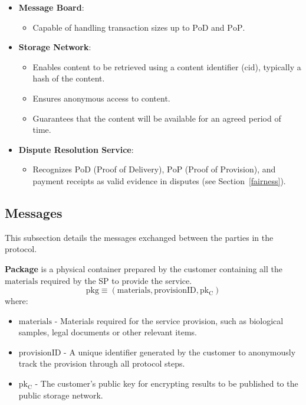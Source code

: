 \documentclass[pdftex,twocolumn,epjc3]{svjour3}
\begin{document}
\begin{itemize}
\item \textbf{Message Board}:
  \begin{itemize}
      \item Capable of handling transaction sizes up to $\mathrm{PoD}$ and $\mathrm{PoP}$.
  \end{itemize}

\item \textbf{Storage Network}:
  \begin{itemize}
      \item Enables content to be retrieved using a content identifier ($\mathrm{cid}$), typically a hash of the content.
      \item Ensures anonymous access to content.
      \item Guarantees that the content will be available for an agreed period of time.
  \end{itemize}

    
\item \textbf{Dispute Resolution Service}:
    \begin{itemize}
        \item Recognizes $\mathrm{PoD}$ (Proof of Delivery), $\mathrm{PoP}$ (Proof of Provision), and payment receipts as valid evidence in disputes (see Section~\ref{fairness}).
    \end{itemize}
\end{itemize}

\subsection{Messages}\label{messages}
This subsection details the messages exchanged between the parties in the protocol.

\vspace{5mm}

\noindent \textbf{Package}\label{package} is a physical container prepared by the customer containing all the $\mathrm{materials}$ required by the SP to provide the service.
\begin{equation}
\mathrm{pkg} \equiv (\mathrm{materials}, \mathrm{provisionID}, \mathrm{pk_C})
\end{equation}
where:
\begin{itemize}
\item $\mathrm{materials}$ - Materials required for the service provision, such as biological samples, legal documents or other relevant items.
\item $\mathrm{provisionID}$ - A unique identifier generated by the customer to anonymously track the provision through all protocol steps.
\item $\mathrm{pk_C}$ - The customer's public key for encrypting results to be published to the public storage network.
\end{itemize}
\end{document}
